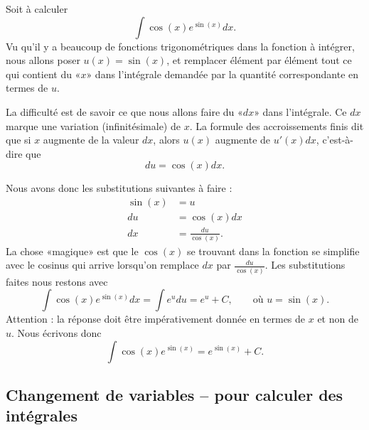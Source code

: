 \begin{example}\label{exempleprimitivechangvar}
	Soit à calculer
	\begin{equation}
		\int \cos(x) e^{\sin(x)}dx.
	\end{equation}
	Vu qu'il y a beaucoup de fonctions trigonométriques dans la fonction à intégrer, nous allons poser \( u(x)=\sin(x)\), et remplacer élément par élément tout ce qui contient du «\( x\)»  dans l'intégrale demandée par la quantité correspondante en termes de \( u\).

	La difficulté est de savoir ce que nous allons faire du «\( dx\)» dans l'intégrale. Ce \( dx \) marque une variation (infinitésimale) de \( x\). La formule des accroissements finis dit que si \( x\) augmente de la valeur \( dx\), alors \( u(x)\) augmente de \( u'(x)dx\), c'est-à-dire que
	\begin{equation}
		du=\cos(x)dx.
	\end{equation}

	Nous avons donc les substitutions suivantes à faire :
	\begin{subequations}
		\begin{align}
			\sin(x) & =u                       \\
			du      & =\cos(x)dx               \\
			dx      & =\frac{ du }{ \cos(x) }.
		\end{align}
	\end{subequations}
	La chose «magique» est que le \( \cos(x)\) se trouvant dans la fonction se simplifie avec le cosinus qui arrive lorsqu'on remplace \( dx\) par \( \frac{ du }{ \cos(x) }\). Les substitutions faites nous restons avec
	\begin{equation}
		\int\cos(x) e^{\sin(x)}dx=\int e^{u}du=e^u + C, \qquad \text{où } u= \sin(x).
	\end{equation}
	Attention : la réponse doit \^etre impérativement donnée en termes de \( x\) et non de \( u\). Nous écrivons donc
	\begin{equation}
		\int \cos(x) e^{\sin(x)}= e^{\sin(x)}+C.
	\end{equation}
\end{example}

\subsection{Changement de variables -- pour calculer des intégrales}

